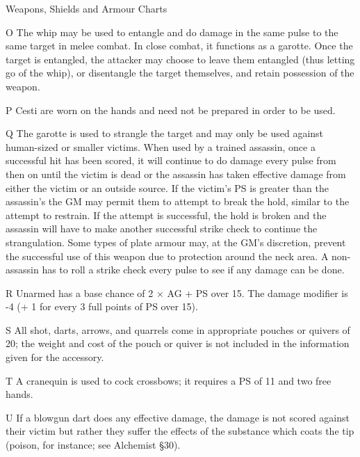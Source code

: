 \begin{Tables}{Weapons, Shields and Armour Charts}
\begin{multicols}{2}
\begin{Description}
\item[O] The whip may be used to entangle and do damage in the same
  pulse to the same target in melee combat.  In close combat, it
  functions as a garotte.  Once the target is entangled, the attacker
  may choose to leave them entangled (thus letting go of the whip), or
  disentangle the target themselves, and retain possession of the
  weapon.

\item[P] Cesti are worn on the hands and need not be prepared in order
  to be used.

\item[Q] The garotte is used to strangle the target and may only be
  used against human-sized or smaller victims.  When used by a trained
  assassin, once a successful hit has been scored, it will continue to
  do damage every pulse from then on until the victim is dead or the
  assassin has taken effective damage from either the victim or an
  outside source.  If the victim’s PS is greater than the assassin’s
  the GM may permit them to attempt to break the hold, similar to the
  attempt to restrain.  If the attempt is successful, the hold is
  broken and the assassin will have to make another successful strike
  check to continue the strangulation.  Some types of plate armour
  may, at the GM’s discretion, prevent the successful use of this
  weapon due to protection around the neck area.  A non-assassin has
  to roll a strike check every pulse to see if any damage can be done.

\item[R] Unarmed has a base chance of 2 × AG + PS over 15. The damage
  modifier is -4 (+ 1 for every 3 full points of PS over 15).

\item[S] All shot, darts, arrows, and quarrels come in appropriate
pouches or quivers of 20; the weight and cost of the pouch or quiver
is not included in the information given for the accessory.

\item[T] A cranequin is used to cock crossbows; it requires a PS of
  11 and two free hands.

\item[U] If a blowgun dart does any effective damage, the damage is
  not scored against their victim but rather they suffer the effects
  of the substance which coats the tip (poison, for instance; see
  Alchemist §30).
\end{Description}
\end{multicols}


\end{Tables}
